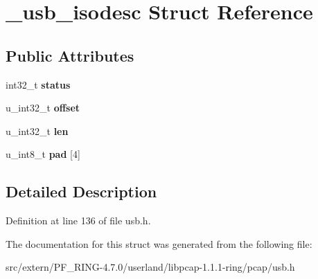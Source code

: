 \hypertarget{struct__usb__isodesc}{
\section{\_\-usb\_\-isodesc Struct Reference}
\label{struct__usb__isodesc}
}
\subsection*{Public Attributes}
\begin{DoxyCompactItemize}
\item 
\hypertarget{struct__usb__isodesc_a06c2378a6bc5ae77a6bb36b61eae60f1}{
int32\_\-t {\bfseries status}}
\label{struct__usb__isodesc_a06c2378a6bc5ae77a6bb36b61eae60f1}

\item 
\hypertarget{struct__usb__isodesc_a48de27274c39ef19492d04743232048b}{
u\_\-int32\_\-t {\bfseries offset}}
\label{struct__usb__isodesc_a48de27274c39ef19492d04743232048b}

\item 
\hypertarget{struct__usb__isodesc_ad7f39e829a540ec1f2dd4c759f72a3d8}{
u\_\-int32\_\-t {\bfseries len}}
\label{struct__usb__isodesc_ad7f39e829a540ec1f2dd4c759f72a3d8}

\item 
\hypertarget{struct__usb__isodesc_ad46125e3087120d2e8271cf3e2b34ba4}{
u\_\-int8\_\-t {\bfseries pad} \mbox{[}4\mbox{]}}
\label{struct__usb__isodesc_ad46125e3087120d2e8271cf3e2b34ba4}

\end{DoxyCompactItemize}


\subsection{Detailed Description}


Definition at line 136 of file usb.h.



The documentation for this struct was generated from the following file:\begin{DoxyCompactItemize}
\item 
src/extern/PF\_\-RING-\/4.7.0/userland/libpcap-\/1.1.1-\/ring/pcap/usb.h\end{DoxyCompactItemize}
